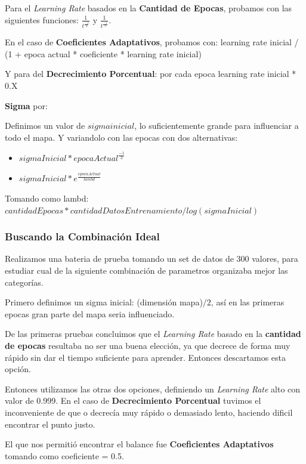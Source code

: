 Para el \emph{Learning Rate} basados en la \textbf{Cantidad de Epocas}, probamos con 
las siguientes funciones: $\frac{1}{t^\frac{-1}{2}}$ y $\frac{1}{t^\frac{-1}{3}}$.


En el caso de \textbf{Coeficientes Adaptativos}, probamos con:
learning rate inicial / (1 + epoca actual * coeficiente * learning rate inicial)

Y para del \textbf{Decrecimiento Porcentual}: por cada epoca learning rate inicial * 0.X


\textbf{Sigma} por:

Definimos un valor de $sigma inicial$, lo suficientemente grande para influenciar a todo 
el mapa. Y variandolo con las epocas con dos alternativas:

\begin{itemize}
	\item $sigmaInicial * {epocaActual^\frac{-1}{3}}$
	\item $sigmaInicial * e^\frac{epocaActual}{lambd}$
\end{itemize}

Tomando como lambd: $cantidadEpocas * cantidadDatosEntrenamiento / log (sigmaInicial)$


\subsubsection{Buscando la Combinación Ideal}

Realizamos una bateria de prueba tomando un set de datos de 300 valores, para
estudiar cual de la siguiente combinación de parametros organizaba mejor
las categorías.

Primero definimos un sigma inicial: (dimensión mapa)$ / 2$, así en las primeras
epocas gran parte del mapa seria influenciado.

De las primeras pruebas concluimos que el \emph{Learning Rate} basado en la 
\textbf{cantidad de epocas} resultaba no ser una buena elección, ya que
decrece de forma muy rápido sin dar el tiempo suficiente para aprender.
Entonces descartamos esta opción.

Entonces utilizamos las otras dos opciones, definiendo un \emph{Learning Rate}
alto con valor de 0.999. En el caso de \textbf{Decrecimiento Porcentual}
tuvimos el inconveniente de que o decrecía muy rápido o demasiado lento, haciendo
dificil encontrar el punto justo.

El que nos permitió encontrar el balance fue \textbf{Coeficientes Adaptativos}
tomando como coeficiente = 0.5.

